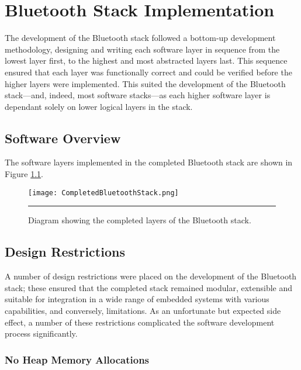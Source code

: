 \chapter{Bluetooth Stack Implementation}
\label{chp:btstackimp}

The development of the Bluetooth stack followed a bottom-up development methodology, designing and writing each software layer in sequence from the lowest layer first, to the highest and most abstracted layers last. This sequence ensured that each layer was functionally correct and could be verified before the higher layers were implemented. This suited the development of the Bluetooth stack---and, indeed, most software stacks---as each higher software layer is dependant solely on lower logical layers in the stack.

\section{Software Overview}

The software layers implemented in the completed Bluetooth stack are shown in Figure \ref{fig:completedbtstacklayers}.

\begin{figure}[tbph]
	\vspace{1em}
	\centering
		\texttt{[image: CompletedBluetoothStack.png]}
	\rule{35em}{0.5pt}
	\caption[Diagram of the completed Bluetooth stack layers]{Diagram showing the completed layers of the Bluetooth stack.}
	\label{fig:completedbtstacklayers}
\end{figure}


\section{Design Restrictions}

A number of design restrictions were placed on the development of the Bluetooth stack; these ensured that the completed stack remained modular, extensible and suitable for integration in a wide range of embedded systems with various capabilities, and conversely, limitations. As an unfortunate but expected side effect, a number of these restrictions complicated the software development process significantly.

\FloatBarrier
\subsection{No Heap Memory Allocations}

